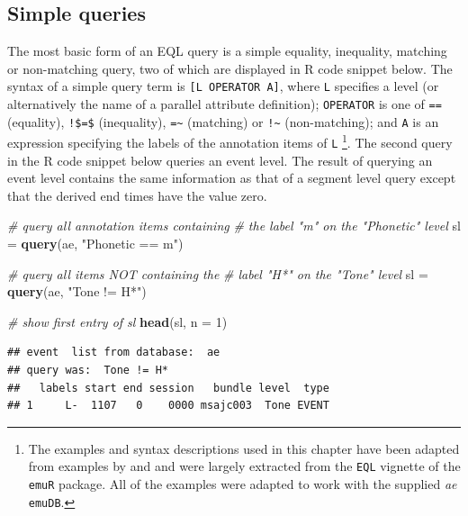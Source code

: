 \documentclass[]{book}
\newenvironment{Shaded}{\begin{snugshade}}{\end{snugshade}}
\newcommand{\CommentTok}[1]{\textcolor[rgb]{0.56,0.35,0.01}{\textit{#1}}}
\newcommand{\DataTypeTok}[1]{\textcolor[rgb]{0.13,0.29,0.53}{#1}}
\newcommand{\DecValTok}[1]{\textcolor[rgb]{0.00,0.00,0.81}{#1}}
\newcommand{\KeywordTok}[1]{\textcolor[rgb]{0.13,0.29,0.53}{\textbf{#1}}}
\newcommand{\NormalTok}[1]{#1}
\newcommand{\StringTok}[1]{\textcolor[rgb]{0.31,0.60,0.02}{#1}}
\let\rmarkdownfootnote\footnote%
\def\footnote{\protect\rmarkdownfootnote}
\begin{document}
\hypertarget{simple-queries}{%
\subsection{Simple queries}\label{simple-queries}}

The most basic form of an EQL query is a simple equality, inequality, matching or non-matching query, two of which are displayed in R code snippet below. The syntax of a simple query term is \texttt{{[}L\ OPERATOR\ A{]}}, where \texttt{L} specifies a level (or alternatively the name of a parallel attribute definition); \texttt{OPERATOR} is one of \texttt{==} (equality), \texttt{!\$=\$} (inequality), \texttt{=\textasciitilde{}} (matching) or \texttt{!\textasciitilde{}} (non-matching); and \texttt{A} is an expression specifying the labels of the annotation items of \texttt{L} \footnote{The examples and syntax descriptions used in this chapter have been adapted from examples by \citet{cassidy:sc2001a} and \citet{harrington:2002aa} and were largely extracted from the \texttt{EQL} vignette of the \texttt{emuR} package. All of the examples were adapted to work with the supplied \emph{ae} \texttt{emuDB}.}. The second query in the R code snippet below queries an event level. The result of querying an event level contains the same information as that of a segment level query except that the derived end times have the value zero.

\begin{Shaded}
\begin{Highlighting}[]
\CommentTok{# query all annotation items containing}
\CommentTok{# the label "m" on the "Phonetic" level}
\NormalTok{sl =}\StringTok{ }\KeywordTok{query}\NormalTok{(ae, }\StringTok{"Phonetic == m"}\NormalTok{)}

\CommentTok{# query all items NOT containing the}
\CommentTok{# label "H*" on the "Tone" level}
\NormalTok{sl =}\StringTok{ }\KeywordTok{query}\NormalTok{(ae, }\StringTok{"Tone != H*"}\NormalTok{)}

\CommentTok{# show first entry of sl}
\KeywordTok{head}\NormalTok{(sl, }\DataTypeTok{n =} \DecValTok{1}\NormalTok{)}
\end{Highlighting}
\end{Shaded}

\begin{verbatim}
## event  list from database:  ae 
## query was:  Tone != H* 
##   labels start end session   bundle level  type
## 1     L-  1107   0    0000 msajc003  Tone EVENT
\end{verbatim}
\end{document}

